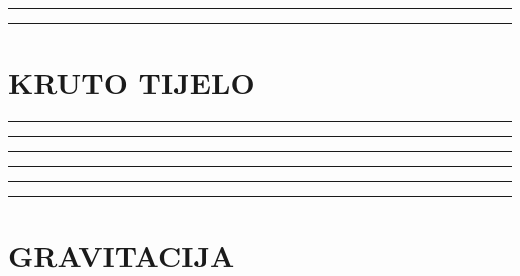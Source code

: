 \documentclass[10pt]{book}
\newcounter{zadatak} %
\newcounter{cjelina}
\begin{document}
\vspace{1cm}


{\color{boja} \rule{\linewidth}{0.3mm} }


\vspace{1cm}


{\color{boja} \rule{\linewidth}{0.3mm} }



\newpage
\chapter{KRUTO TIJELO}
\setcounter{zadatak}{0}




{\color{boja} \rule{\linewidth}{0.3mm} }

\vspace{0.2cm} 




{\color{boja} \rule{\linewidth}{0.3mm} }

\vspace{0.2cm}





{\color{boja} \rule{\linewidth}{0.3mm} }


\vspace{1cm}


{\color{boja} \rule{\linewidth}{0.3mm} }



\vspace{1cm}


{\color{boja} \rule{\linewidth}{0.3mm} }


\vspace{1cm}


{\color{boja} \rule{\linewidth}{0.3mm} }






\setcounter{zadatak}{0}

\newpage
\chapter{GRAVITACIJA}
\end{document}
